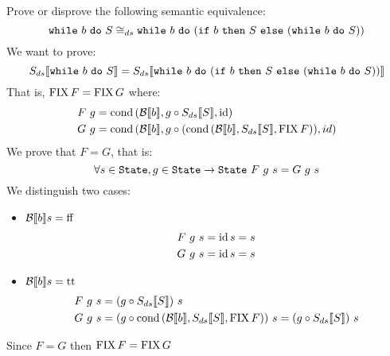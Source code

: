 \begin{exercise}{
    Prove or disprove the following semantic equivalence:
    \[ \wwhile{b}{S} \DScong \wwhile{b}{(\wif{b}{S}{(\wwhile{b}{S})})} \]
}
    We want to prove:
    \[ \Sds{\wwhile{b}{S}} = \Sds{\wwhile{b}{(\wif{b}{S}{(\wwhile{b}{S})})}} \]
    That is, $\FIX F = \FIX G$ where:
    \begin{align*}
        F\ g &= \cond{\Bool{b}}{g \circ \Sds{S}}{\id} \\
        G\ g &= \cond{\Bool{b}}{g \circ (\cond{\Bool{b}}{\Sds{S}}{\FIX F})}{id}
    \end{align*}
    We prove that $F = G$, that is:
    \[ \forall s \in \State, g \in \State \to \State \ F\ g\ s = G\ g\ s \]
    We distinguish two cases:
    \begin{itemize}
        \item $\Bool{b} s = \False$
            \begin{align*}
                F\ g \ s = \id s = s \\
                G\ g \ s = \id s = s
            \end{align*}
        \item $\Bool{b} s = \True$
            \begin{align*}
                F\ g\ s &= (g \circ \Sds{S})\ s \\
                G\ g\ s &= (g \circ \cond{\Bool{b}}{\Sds{S}}{\FIX F})\ s = (g \circ \Sds{S})\ s
            \end{align*}
    \end{itemize}
    Since $F = G$ then $\FIX F = \FIX G$
\end{exercise}
